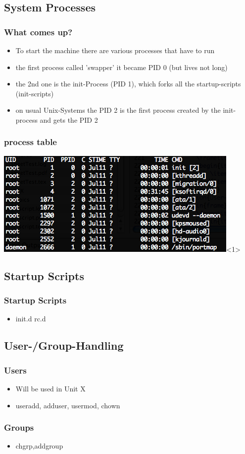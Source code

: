 \documentclass[hyperref={pdfpagelabels=false}]{beamer}
\begin{document}
    \subsection{System Processes}
	    \begin{frame}
			\frametitle{What comes up?}
			\begin{itemize}
                \item<1-> To start the machine there are various processes that have to run
                \item<1-> the first process called 'swapper' it became PID 0 (but lives not long)
                \item<2-> the 2nd one is the init-Process (PID 1), which forks all the startup-scripts (init-scripts)
                \item<3-> on usual Unix-Systems the PID 2 is the first process created by the init-process and gets the PID 2
            \end{itemize}
		\end{frame}
	    \begin{frame}
			\frametitle{process table}
			\includegraphics[height=0.45\columnwidth]{pics/ps.png}<1>%
		\end{frame}
    \subsection{Startup Scripts}
	    \begin{frame}
			\frametitle{Startup Scripts}
			\begin{itemize}
                \item<2-> init.d rc.d
            \end{itemize}
		\end{frame}
    \subsection{User-/Group-Handling}
	    \begin{frame}
			\frametitle{Users}
			\begin{itemize}
                \item<2-> Will be used in Unit X
                \item<2-> useradd, adduser, usermod, chown
            \end{itemize}
		\end{frame}
	    \begin{frame}
			\frametitle{Groups}
			\begin{itemize}
                \item<2-> chgrp,addgroup
            \end{itemize}
		\end{frame}
\end{document}
